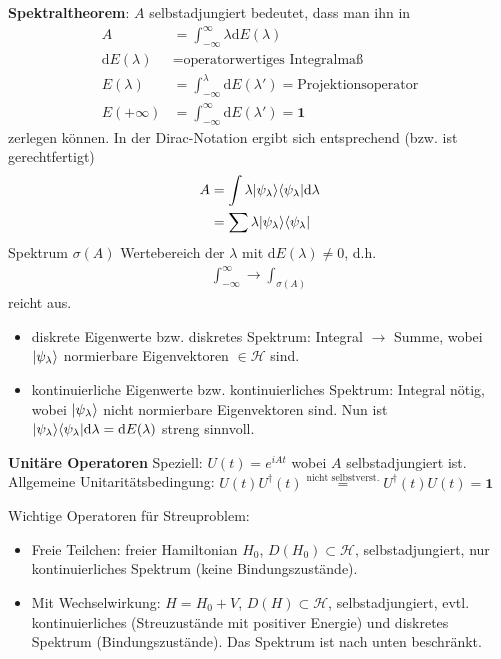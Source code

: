 \documentclass[11pt,a4paper]{report}
\begin{document}
\textbf{Spektraltheorem}:
$A$ selbstadjungiert bedeutet, dass man ihn in
\begin{align*}
    A &= \int_{-\infty}^\infty \lambda \mathrm{d}E(\lambda) \\
    \mathrm{d}E(\lambda) &= \text{operatorwertiges Integralmaß} \\
    E(\lambda) &= \int_{-\infty}^{\lambda} \mathrm{d}E(\lambda') = \text{Projektionsoperator} \\
    E(+\infty) &= \int_{-\infty}^\infty \mathrm{d}E(\lambda') = \mathbf{1}
\end{align*}
zerlegen können.
In der Dirac-Notation ergibt sich entsprechend (bzw. ist gerechtfertigt)
\begin{align*}
    A &= \int \lambda |\psi_\lambda\rangle \langle \psi_\lambda | \mathrm{d}\lambda \\
    &= \sum \lambda |\psi_\lambda\rangle \langle \psi_\lambda |
\end{align*}
Spektrum $\sigma(A)$ Wertebereich der $\lambda$ mit $\mathrm{d}E(\lambda) \neq 0$, d.h.
\begin{align*}
    \int_{-\infty}^\infty \rightarrow \int_{\sigma(A)}
\end{align*}
reicht aus.
\begin{itemize}
    \item diskrete Eigenwerte bzw. diskretes Spektrum: Integral $\rightarrow$ Summe, wobei $|\psi_\lambda\rangle$ normierbare Eigenvektoren $\in \mathcal{H}$ sind.
    \item kontinuierliche Eigenwerte bzw. kontinuierliches Spektrum: Integral nötig, wobei $|\psi_\lambda\rangle$ nicht normierbare Eigenvektoren sind. Nun ist $|\psi_\lambda\rangle\langle \psi_\lambda | \mathrm{d}\lambda = \mathrm{d}E(\lambda)$ streng sinnvoll.
\end{itemize}

\textbf{Unitäre Operatoren}
Speziell: $U(t) = e^{i A t}$ wobei $A$ selbstadjungiert ist.
Allgemeine Unitaritätsbedingung: $U(t) U^\dagger(t) \stackrel{\text{nicht selbstverst.}}{=} U^\dagger(t) U(t) = \mathbf{1}$

Wichtige Operatoren für Streuproblem:
\begin{itemize}
    \item Freie Teilchen: freier Hamiltonian $H_0$, $D(H_0) \subset \mathcal{H}$, selbstadjungiert, nur kontinuierliches Spektrum (keine Bindungszustände).
    \item Mit Wechselwirkung: $H =  H_0 + V$, $D(H) \subset \mathcal{H}$, selbstadjungiert, evtl. kontinuierliches (Streuzustände mit positiver Energie) und diskretes Spektrum (Bindungszustände). Das Spektrum ist nach unten beschränkt.
\end{itemize}
\end{document}
